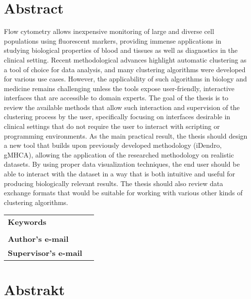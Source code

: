 \section*{Abstract}

Flow cytometry allows inexpensive monitoring of large and diverse cell populations using fluorescent markers, providing immense applications in studying biological properties of blood and tissues as well as diagnostics in the clinical setting. Recent methodological advances highlight automatic clustering as a tool of choice for data analysis, and many clustering algorithms were developed for various use cases. However, the applicability of such algorithms in biology and medicine remains challenging unless the tools expose user-friendly, interactive interfaces that are accessible to domain experts. The goal of the thesis is to review the available methods that allow such interaction and supervision of the clustering process by the user, specifically focusing on interfaces desirable in clinical settings that do not require the user to interact with scripting or programming environments. As the main practical result, the thesis should design a new tool that builds upon previously developed methodology (iDendro, gMHCA), allowing the application of the researched methodology on realistic datasets. By using proper data visualization techniques, the end user should be able to interact with the dataset in a way that is both intuitive and useful for producing biologically relevant results. The thesis should also review data exchange formats that would be suitable for working with various other kinds of clustering algorithms. 

\bigskip

\begin{tabular}{lp{8.6cm}}
		\textbf{Keywords} & \Keywords \\
 		& \\
 		\textbf{Author's e-mail} & \texttt{\href{mailto:\Email}{\Email}}\\
		\textbf{Supervisor's e-mail} & \texttt{\href{mailto:\EmailSup}{\EmailSup}}\\
\end{tabular}

\bigskip

\section*{Abstrakt}\label{abstract}

